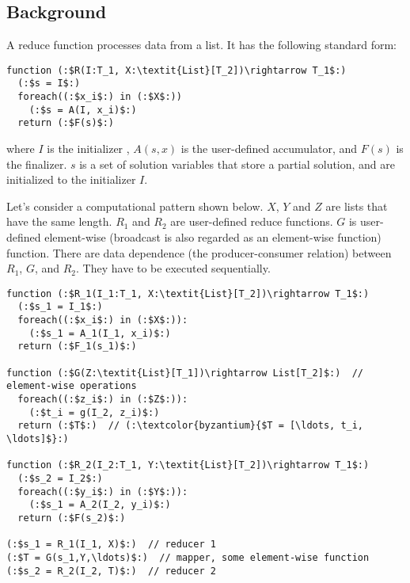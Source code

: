 \subsection{Background}

A reduce function processes data from a list. It has the following standard form:
\begin{lstlisting}[language=code_example, caption={}]
function (:$R(I:T_1, X:\textit{List}[T_2])\rightarrow T_1$:)
  (:$s = I$:)
  foreach((:$x_i$:) in (:$X$:))
    (:$s = A(I, x_i)$:)
  return (:$F(s)$:)
\end{lstlisting}

where $I$ is the initializer , $A(s, x)$ is the user-defined accumulator, and $F(s)$ is the finalizer.
$s$ is a set of solution variables that store a partial solution,
and are initialized to the initializer $I$.

Let's consider a computational pattern shown below.
$X$, $Y$ and $Z$ are lists that have the same length. $R_1$ and $R_2$ are user-defined reduce functions.
$G$ is user-defined element-wise (broadcast is also regarded as an element-wise function) function.
There are data dependence (the producer-consumer relation) between $R_1$, $G$, and $R_2$.
They have to be executed sequentially.

\begin{lstlisting}[language=code_example, caption={Consecutive reduce functions.}]
function (:$R_1(I_1:T_1, X:\textit{List}[T_2])\rightarrow T_1$:)
  (:$s_1 = I_1$:)
  foreach((:$x_i$:) in (:$X$:)):
    (:$s_1 = A_1(I_1, x_i)$:)
  return (:$F_1(s_1)$:)

function (:$G(Z:\textit{List}[T_1])\rightarrow List[T_2]$:)  // element-wise operations
  foreach((:$z_i$:) in (:$Z$:)):
    (:$t_i = g(I_2, z_i)$:)
  return (:$T$:)  // (:\textcolor{byzantium}{$T = [\ldots, t_i, \ldots]$}:)

function (:$R_2(I_2:T_1, Y:\textit{List}[T_2])\rightarrow T_1$:)
  (:$s_2 = I_2$:)
  foreach((:$y_i$:) in (:$Y$:)):
    (:$s_1 = A_2(I_2, y_i)$:)
  return (:$F(s_2)$:)

(:$s_1 = R_1(I_1, X)$:)  // reducer 1
(:$T = G(s_1,Y,\ldots)$:)  // mapper, some element-wise function
(:$s_2 = R_2(I_2, T)$:)  // reducer 2
\end{lstlisting}

